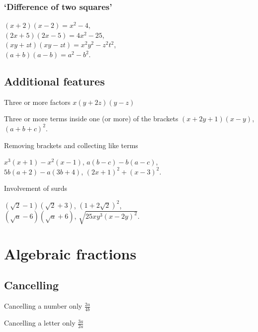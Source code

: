 \documentclass{article}
\begin{document}
\subsubsection{\lq Difference of two squares'}

\begin{flushright}
\((x+2)(x-2) = x^2 - 4\), \\
\((2x+5)(2x-5) = 4x^2 - 25\), \\
\((xy+zt)(xy - zt) = x^2y^2 - z^2t^2\), \\
\((a+b)(a-b) = a^2 - b^2\).
\end{flushright}

\subsection{Additional features}

Three or more factors \hfill \(x(y+2z)(y - z)\)

Three or more terms inside one (or more) of the brackets \hfill \((x+2y+1)(x-y)\), \((a+b+c)^2\).

Removing brackets and collecting like terms
\vspace{-1.2cm}
\begin{flushright}
\(x^3(x+1) - x^2(x-1)\), \(a(b-c)-b(a-c)\), \\
\(5b(a+2) - a(3b+4)\), \((2x+1)^2 + (x-3)^2\).
\end{flushright}

Involvement of surds
\vspace{-1.2cm}
\begin{flushright}
\(\left(  \sqrt{2} - 1 \right)  \left(  \sqrt{2} + 3 \right) \), \( \left(  1 + 2 \sqrt{2} \right)  ^2\), \\
\( \left(  \sqrt{a} - 6 \right)  \left(  \sqrt{a} + 6 \right) \), \(\sqrt{25xy^3(x - 2y)^2}\).
\end{flushright}

\section{Algebraic fractions}

\subsection{Cancelling}

Cancelling a number only \hfill \(\frac{2a}{4b}\)

Cancelling a letter only \hfill \(\frac{3a}{2a}\)
\end{document}
